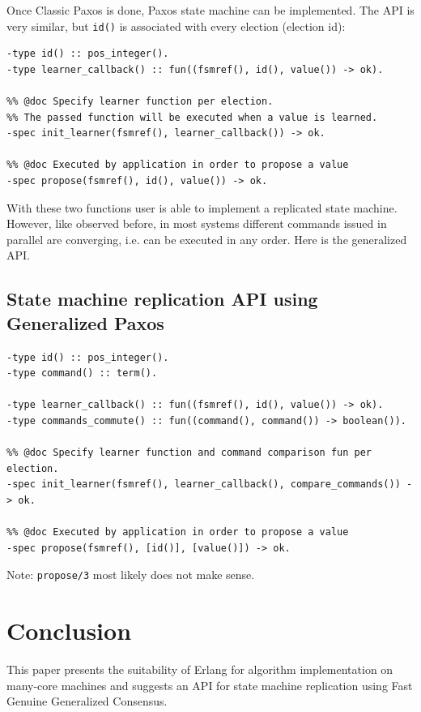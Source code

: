\documentclass[english,11pt]{article}
\newcommand{\fggc}{Fast Genuine Generalized Consensus}
\begin{document}
Once Classic Paxos is done, Paxos state machine can be implemented. The API is
very similar, but {\tt id()} is associated with every election (election id):

\begin{verbatim}
-type id() :: pos_integer().
-type learner_callback() :: fun((fsmref(), id(), value()) -> ok).

%% @doc Specify learner function per election.
%% The passed function will be executed when a value is learned.
-spec init_learner(fsmref(), learner_callback()) -> ok.

%% @doc Executed by application in order to propose a value
-spec propose(fsmref(), id(), value()) -> ok.
\end{verbatim}

With these two functions user is able to implement a replicated state machine.
However, like observed before, in most systems different commands issued in
parallel are converging, i.e. can be executed in any order. Here is the
generalized API.

\subsection{State machine replication API using Generalized Paxos}

\begin{verbatim}
-type id() :: pos_integer().
-type command() :: term().

-type learner_callback() :: fun((fsmref(), id(), value()) -> ok).
-type commands_commute() :: fun((command(), command()) -> boolean()).

%% @doc Specify learner function and command comparison fun per election.
-spec init_learner(fsmref(), learner_callback(), compare_commands()) -> ok.

%% @doc Executed by application in order to propose a value
-spec propose(fsmref(), [id()], [value()]) -> ok.
\end{verbatim}

Note: {\tt propose/3} most likely does not make sense.

\section{Conclusion}
\label{sec:conclusion}

This paper presents the suitability of Erlang for algorithm implementation on
many-core machines and suggests an API for state machine replication using
\fggc.
\end{document}

